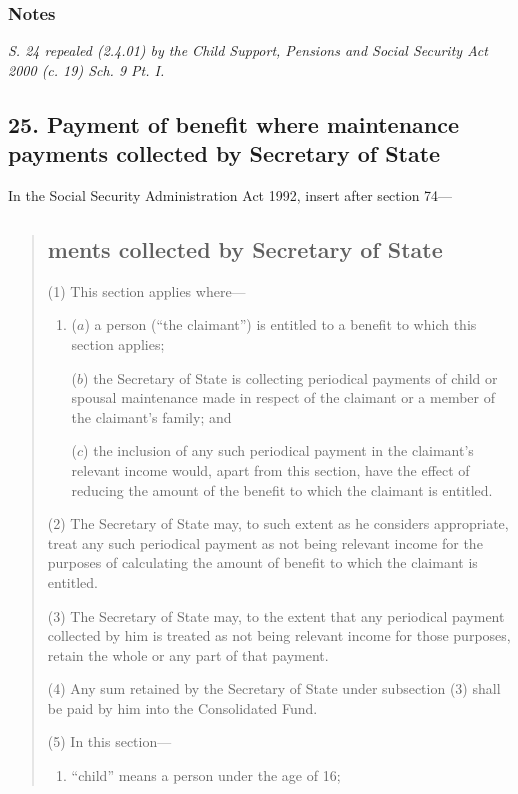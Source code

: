 \documentclass[a4paper]{article}
\newcommand\amendment[1]{\subsubsection*{Notes}{\itshape\frenchspacing\footnotesize #1 \par}}
\begin{document}
\amendment{
S. 24 repealed (2.4.01) by the Child Support, Pensions and Social Security Act 2000 (c. 19) Sch. 9 Pt. I.
}

\subsection{25. Payment of benefit where maintenance payments collected by Secretary of State}

In the Social Security Administration Act 1992, insert after section 74—
\begin{quotation}
\subsection*{\sloppy {}ments collected by Secretary of State}

(1) This section applies where—
\begin{enumerate}\item[]
($a$) a person (“the claimant”) is entitled to a benefit to which this section applies;

($b$) the Secretary of State is collecting periodical payments of child or spousal maintenance made in respect of the claimant or a member of the claimant’s family; and

\begin{sloppypar}
($c$) the inclusion of any such periodical payment in the claimant’s relevant income would, apart from this section, have the effect of reducing the amount of the benefit to which the claimant is entitled.
\end{sloppypar}
\end{enumerate}

(2) The Secretary of State may, to such extent as he considers appropriate, treat any such periodical payment as not being relevant income for the purposes of calculating the amount of benefit to which the claimant is entitled.

(3) The Secretary of State may, to the extent that any periodical payment collected by him is treated as not being relevant income for those purposes, retain the whole or any part of that payment.

(4) Any sum retained by the Secretary of State under subsection (3) shall be paid by him into the Consolidated Fund.

(5) In this section—
\begin{enumerate}\item[]
“child” means a person under the age of 16;


\end{enumerate}
\end{quotation}
\end{document}
